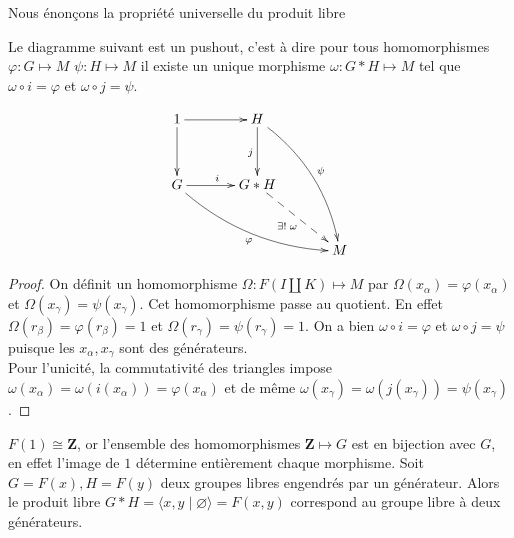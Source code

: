 \documentclass[main.tex]{subfiles}
\begin{document}
	\begin{prop}
		Nous énonçons la propriété universelle du produit libre \\

		\medskip
		\begin{minipage}{0.5\textwidth}
			Le diagramme suivant est un pushout, c'est à dire pour tous homomorphismes $\varphi : G \longmapsto M$ $\psi : H \longmapsto M$ il existe un unique morphisme $\omega : G*H \longmapsto M$ tel que $\omega \circ i = \varphi$ et $\omega \circ j = \psi$.
		\end{minipage}	
		\hfill
		\begin{minipage}{0.5\textwidth}
			\[
			\xymatrix@R=1.2cm@C=1.2cm{
			 1 \ar[r]      \ar[d]         & H \ar[d]_{j} \ar@/^1pc/[rdd]^{\psi}   \\
			 G \ar[r]^{i} \ar@/_1pc/[rrd]_{\varphi} & G*H \ar@{-->}[rd]_{\exists! \; \omega}             \\
							      &                                   & M 
			}
	\]
		\end{minipage}
	\end{prop}
	\medskip
	\begin{proof}
		On définit un homomorphisme $\Omega : F(I \amalg K) \longmapsto M$ par $\Omega(x_{\alpha}) = \varphi(x_{\alpha})$ et $\Omega(x_{\gamma}) = \psi(x_{\gamma})$. Cet homomorphisme passe au quotient. En effet $\Omega(r_{\beta}) = \varphi(r_{\beta}) = 1$ et $\Omega(r_{\gamma}) = \psi(r_{\gamma}) = 1$. On a bien $\omega \circ i = \varphi$ et $\omega \circ j = \psi$ puisque les $x_{\alpha},x_{\gamma}$ sont des générateurs. \\
		Pour l'unicité, la commutativité des triangles impose $\omega(x_{\alpha}) = \omega(i(x_{\alpha})) = \varphi(x_{\alpha})$ et de même $\omega(x_{\gamma}) = \omega(j(x_{\gamma})) = \psi(x_{\gamma})$.
	\end{proof}

	\begin{example}
		$F(1) \cong \mathbf{Z}$, or l'ensemble des homomorphismes $\mathbf{Z} \longmapsto G$ est en bijection avec $G$, en effet l'image de $1$ détermine entièrement chaque morphisme. Soit $G = F(x), H = F(y)$ deux groupes libres engendrés par un générateur. Alors le produit libre $G*H = \langle x,y \;|\; \varnothing \rangle = F(x,y)$ correspond au groupe libre à deux générateurs.	
	\end{example}
\end{document}
